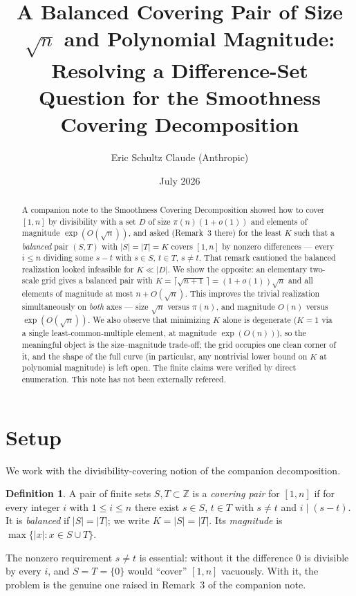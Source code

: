 \documentclass[11pt]{article}
\title{A Balanced Covering Pair of Size $\sqrt{n}$ and Polynomial Magnitude:\\
Resolving a Difference-Set Question for the Smoothness Covering Decomposition}
\author{Eric Schultz \qquad Claude (Anthropic)}
\date{July 2026}
\theoremstyle{definition}
\newtheorem{definition}{Definition}
\newcommand{\Z}{\mathbb{Z}}
\newcommand{\abs}[1]{\left\lvert #1 \right\rvert}
\begin{document}
\maketitle

\begin{abstract}
A companion note to the Smoothness Covering Decomposition showed how to cover $[1,n]$ by
divisibility with a set $D$ of size $\pi(n)(1+o(1))$ and elements of magnitude
$\exp(O(\sqrt n))$, and asked (Remark~3 there) for the least $K$ such that a
\emph{balanced} pair $(S,T)$ with $\abs{S}=\abs{T}=K$ covers $[1,n]$ by nonzero
differences --- every $i\le n$ dividing some $s-t$ with $s\in S$, $t\in T$, $s\ne t$. That
remark cautioned the balanced realization looked infeasible for $K\ll\abs{D}$. We show the
opposite: an elementary two-scale grid gives a balanced pair with
$K=\lceil\sqrt{n+1}\,\rceil=(1+o(1))\sqrt n$ and all elements of magnitude at most
$n+O(\sqrt n)$. This improves the trivial realization simultaneously on \emph{both} axes
--- size $\sqrt n$ versus $\pi(n)$, and magnitude $O(n)$ versus $\exp(O(\sqrt n))$. We also
observe that minimizing $K$ alone is degenerate ($K=1$ via a single least-common-multiple
element, at magnitude $\exp(O(n))$), so the meaningful object is the size--magnitude
trade-off; the grid occupies one clean corner of it, and the shape of the full curve
(in particular, any nontrivial lower bound on $K$ at polynomial magnitude) is left open.
The finite claims were verified by direct enumeration. This note has not been externally
refereed.
\end{abstract}

\section{Setup}

We work with the divisibility-covering notion of the companion decomposition.

\begin{definition}
A pair of finite sets $S,T\subset\Z$ is a \emph{covering pair} for $[1,n]$ if for every
integer $i$ with $1\le i\le n$ there exist $s\in S$, $t\in T$ with $s\ne t$ and
$i\mid(s-t)$. It is \emph{balanced} if $\abs S=\abs T$; we write $K=\abs S=\abs T$. Its
\emph{magnitude} is $\max\{\abs x : x\in S\cup T\}$.
\end{definition}

The nonzero requirement $s\ne t$ is essential: without it the difference $0$ is divisible
by every $i$, and $S=T=\{0\}$ would ``cover'' $[1,n]$ vacuously. With it, the problem is
the genuine one raised in Remark~3 of the companion note.
\end{document}
